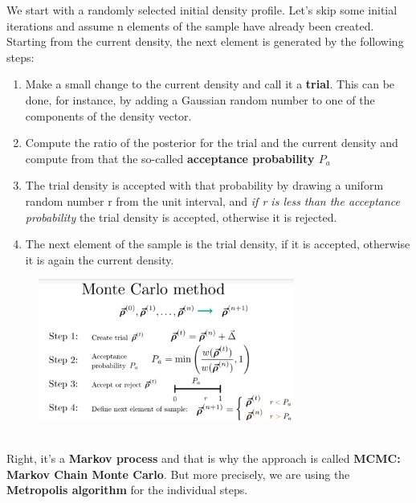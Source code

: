 \documentclass[12pt, a4paper]{scrartcl}
\begin{document}
We start with a randomly selected initial density proﬁle. Let’s skip
some initial iterations and assume n elements of the sample have already
been created. 
Starting from the current density, the next element is generated by the
following steps:
\begin{enumerate}
\item Make a small change to the current density and call it a \textbf{trial}. 
This can be done, for instance, by adding a Gaussian random number
to one of the components of the density vector.
\item Compute the ratio of the posterior for the trial and the current
density and compute from that the so-called  \textbf{acceptance probability $P_a$}
\item The trial density is accepted with that probability by drawing
a uniform random number r from the unit interval, and \textit{if r is less than
the acceptance probability} the trial density is accepted, otherwise it is
rejected.
\item The next element of the sample is the trial density, if it is
accepted, otherwise it is again the current density.
\end{enumerate}%
 \begin{figure}[H]
	\centering
	\includegraphics[width=0.75\textwidth]{9_6.png}
\end{figure}

\\

Right, it’s a  \textbf{Markov process} and that is why the approach is called  \textbf{MCMC:
Markov Chain Monte Carlo}. But more precisely, we are using the  \textbf{Metropolis
algorithm} for the individual steps. \\
\end{document}
